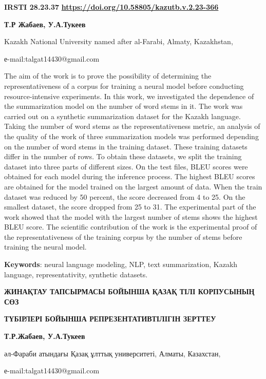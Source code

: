 \newpage
{\bfseries IRSTI 28.23.37}
\hfill {\bfseries \href{https://doi.org/10.58805/kazutb.v.2.23-366}{https://doi.org/10.58805/kazutb.v.2.23-366}}


\begin{center}
{\bfseries Т.Р Жабаев\envelope, У.А.Тукеев}

Kazakh National University named after al-Farabi, Almaty, Kazakhstan,

е-mail:talgat14430@gmail.com
\end{center}

The aim of the work is to prove the possibility of determining the
representativeness of a corpus for training a neural model before
conducting resource-intensive experiments. In this work, we investigated
the dependence of the summarization model on the number of word stems in
it. The work was carried out on a synthetic summarization dataset for
the Kazakh language. Taking the number of word stems as the
representativeness metric, an analysis of the quality of the work of
three summarization models was performed depending on the number of word
stems in the training dataset. These training datasets differ in the
number of rows. To obtain these datasets, we split the training dataset
into three parts of different sizes. On the test files, BLEU scores were
obtained for each model during the inference process. The highest BLEU
scores are obtained for the model trained on the largest amount of data.
When the train dataset was reduced by 50 percent, the score decreased
from 4 to 25. On the smallest dataset, the score dropped from 25 to 31.
The experimental part of the work showed that the model with the largest
number of stems shows the highest BLEU score. The scientific
contribution of the work is the experimental proof of the
representativeness of the training corpus by the number of stems before
training the neural model.

{\bfseries Keywords}: neural language modeling, NLP, text summarization,
Kazakh language, representativity, synthetic datasets.

\begin{center}
{\large\bfseries ЖИНАҚТАУ ТАПСЫРМАСЫ БОЙЫНША ҚАЗАҚ ТІЛІ КОРПУСЫНЫҢ СӨЗ}

{\bfseries ТҮБІРЛЕРІ БОЙЫНША РЕПРЕЗЕНТАТИВТІЛІГІН ЗЕРТТЕУ}

{\bfseries Т.Р.Жабаев\envelope, У.А.Тукеев}

әл-Фараби атындағы Қазақ ұлттық университеті, Алматы, Казахстан,

е-mail:talgat14430@gmail.com
\end{center}

